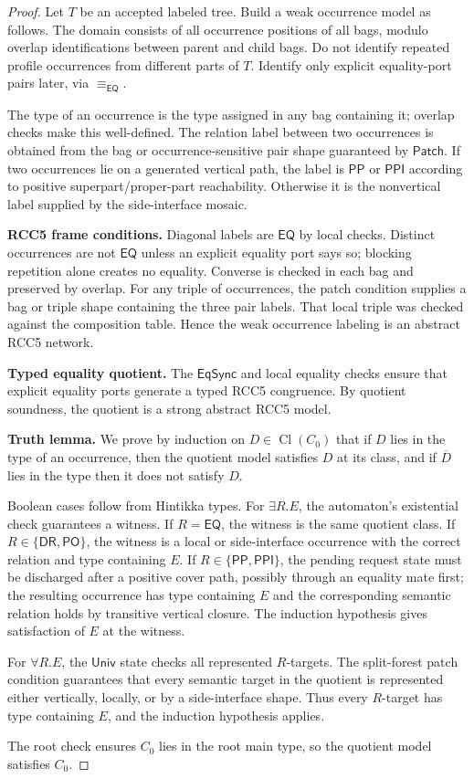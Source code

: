 \documentclass[11pt]{article}
\newcommand{\EQ}{\mathsf{EQ}}
\newcommand{\PP}{\mathsf{PP}}
\newcommand{\PPI}{\mathsf{PPI}}
\newcommand{\PO}{\mathsf{PO}}
\newcommand{\DR}{\mathsf{DR}}
\newcommand{\Cl}{\operatorname{Cl}}
\begin{document}
\begin{proof}
Let $T$ be an accepted labeled tree.  Build a weak occurrence model as follows.  The domain consists of all occurrence positions of all bags, modulo overlap identifications between parent and child bags.  Do not identify repeated profile occurrences from different parts of $T$.  Identify only explicit equality-port pairs later, via $\equiv_{\EQ}$.

The type of an occurrence is the type assigned in any bag containing it; overlap checks make this well-defined.  The relation label between two occurrences is obtained from the bag or occurrence-sensitive pair shape guaranteed by $\mathsf{Patch}$.  If two occurrences lie on a generated vertical path, the label is $\PP$ or $\PPI$ according to positive superpart/proper-part reachability.  Otherwise it is the nonvertical label supplied by the side-interface mosaic.

\smallskip
\noindent\textbf{RCC5 frame conditions.}  Diagonal labels are $\EQ$ by local checks.  Distinct occurrences are not $\EQ$ unless an explicit equality port says so; blocking repetition alone creates no equality.  Converse is checked in each bag and preserved by overlap.  For any triple of occurrences, the patch condition supplies a bag or triple shape containing the three pair labels.  That local triple was checked against the composition table.  Hence the weak occurrence labeling is an abstract RCC5 network.

\smallskip
\noindent\textbf{Typed equality quotient.}  The $\mathsf{EqSync}$ and local equality checks ensure that explicit equality ports generate a typed RCC5 congruence.  By quotient soundness, the quotient is a strong abstract RCC5 model.

\smallskip
\noindent\textbf{Truth lemma.}  We prove by induction on $D\in\Cl(C_0)$ that if $D$ lies in the type of an occurrence, then the quotient model satisfies $D$ at its class, and if $\overline D$ lies in the type then it does not satisfy $D$.

Boolean cases follow from Hintikka types.  For $\exists R.E$, the automaton's existential check guarantees a witness.  If $R=\EQ$, the witness is the same quotient class.  If $R\in\{\DR,\PO\}$, the witness is a local or side-interface occurrence with the correct relation and type containing $E$.  If $R\in\{\PP,\PPI\}$, the pending request state must be discharged after a positive cover path, possibly through an equality mate first; the resulting occurrence has type containing $E$ and the corresponding semantic relation holds by transitive vertical closure.  The induction hypothesis gives satisfaction of $E$ at the witness.

For $\forall R.E$, the $\mathsf{Univ}$ state checks all represented $R$-targets.  The split-forest patch condition guarantees that every semantic target in the quotient is represented either vertically, locally, or by a side-interface shape.  Thus every $R$-target has type containing $E$, and the induction hypothesis applies.

The root check ensures $C_0$ lies in the root main type, so the quotient model satisfies $C_0$.
\end{proof}
\end{document}
